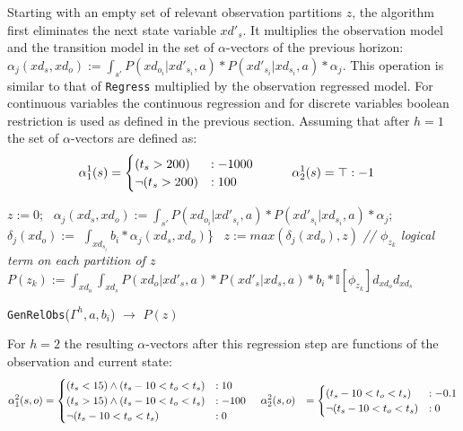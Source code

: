 \documentclass{article} %
\begin{document}
Starting with an empty set of relevant observation partitions $z$, the algorithm first eliminates the next state variable $xd'_s$. It multiplies the observation model and the transition model in the set of $\alpha$-vectors of the previous horizon:
$\alpha_j(xd_s,xd_o) := \int_{s'} P(xd_{o_i}|xd'_{s_i},a) * P(xd'_{s_i}| xd_{s_i},a)* \alpha_j $. 
This operation is similar to that of \texttt{Regress} multiplied by the observation regressed model. For continuous variables the continuous regression and for discrete variables boolean restriction is used as defined in the previous section. 
Assuming that after $h=1$ the set of $\alpha$-vectors are defined as:
{\footnotesize
\begin{align}
\alpha_1^1(s) &= 
\begin{cases}
 (t_s>200) &: -1000 \\
\neg(t_s>200) &: 100 \\
\end{cases}
\hspace{10mm} 
\alpha_2^1(s) = \top: -1 \nonumber
\end{align}
}
\incmargin{.5em}
\linesnumbered
\begin{algorithm}[t!]
\vspace{-.5mm}
\dontprintsemicolon
{}

\Begin
{
	$z:=0$;\	
		{
    	$\alpha_j(xd_s,xd_o) := \int_{s'} P(xd_{o_i}|xd'_{s_i},a) * P(xd'_{s_i}| xd_{s_i},a)* \alpha_j $;\
		}  
		\For {all $j$ in $\alpha_j(xd_s,xd_o)$}    
		{
		$\delta_{j}(xd_o) := $ $\int_{xd_{s_i}} b_i * \alpha_j(xd_s,xd_o)$\}\ \;
		}
		\For {all $j$ in $\delta_{j}(xd_o)$}    
		{
		$z := max(\delta_j(xd_o),z)$\;
    	}
    	\emph{// $\phi_{z_k}$ logical term on each partition of $z$}\\
   		$P(z_k) := \int_{xd_o}\int_{xd_s} P(xd_o|xd'_s,a)*P(xd'_s|xd_s,a)*b_i* \mathbb{I}[\phi_{z_k}] d_{xd_o} d_{xd_s}$ \;
    \Return{$P(z)$} \;
}
\caption{\footnotesize \texttt{GenRelObs}($\Gamma^h,a,b_i$) $\longrightarrow$ $P(z)$ }
\vspace{-1mm}
\end{algorithm}
\decmargin{.5em}
For $h=2$ the resulting $\alpha$-vectors after this regression step are functions of the observation and current state: 
{\footnotesize
\begin{align}
\alpha_1^2(s,o) &= 
\begin{cases}
 (t_s<15)\wedge (t_s - 10 < t_o<t_s) &: 10 \\
(t_s>15)\wedge (t_s - 10 < t_o<t_s) &: -100  \\
\neg(t_s - 10 < t_o<t_s) &: 0
\end{cases}
\hspace{4mm} 
\alpha_2^2(s,o) &= \begin{cases}
(t_s - 10 < t_o<t_s) &: -0.1 \\
\neg(t_s - 10 < t_o<t_s) &: 0
\end{cases}
\nonumber
\end{align}
}
\end{document}
